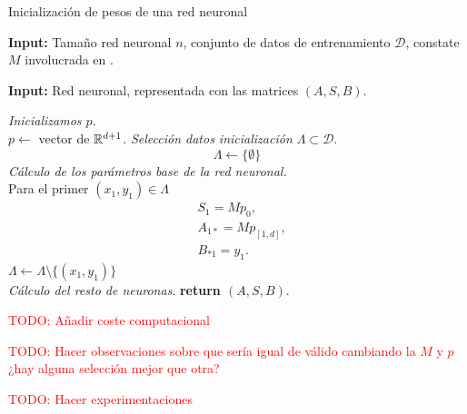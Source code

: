 \begin{algorithm}[H]
    \caption{Inicialización de pesos de una red neuronal}
    \textbf{Input:} Tamaño red neuronal $n$, conjunto de datos de entrenamiento $\mathcal{D}$, constate $M$ involucrada en .

    \textbf{Input:} Red neuronal, representada con las matrices $(A,S,B)$.
    \hspace*{\algorithmicindent} 
    \begin{algorithmic}[1]
       \STATE \textit{Inicializamos $p$}. \\
       $p \gets$ vector de $\mathbb{R}^{d+1}$. 
       \STATE \textit{Selección datos inicialización
       $\Lambda \subset \mathcal{D}$}. \\
       \begin{equation}
           \Lambda \gets \{ \emptyset \}
       \end{equation}
       \STATE \textit{Cálculo de los parámetros base de la red neuronal.} \\
       
       Para el primer $(x_1, y_1) \in \Lambda$ \\
       \begin{align}
            &S_1 = M p_0, \\
            & A_{1 *} = M p_{[1,d]}, \\
            & B_{* 1} = y_1.
        \end{align}
       $\Lambda \gets \Lambda \setminus \{(x_1, y_1)\} $ \\
       \STATE \textit{Cálculo del resto de neuronas}. 
       \STATE \textbf{return $(A,S,B)$}.
    \end{algorithmic}  
\end{algorithm}

\textcolor{red}{TODO: Añadir coste computacional}

\textcolor{red}{TODO: Hacer observaciones sobre que sería igual de válido cambiando la $M$ y $p$ ¿hay alguna selección mejor que otra? }

\textcolor{red}{TODO: Hacer experimentaciones }